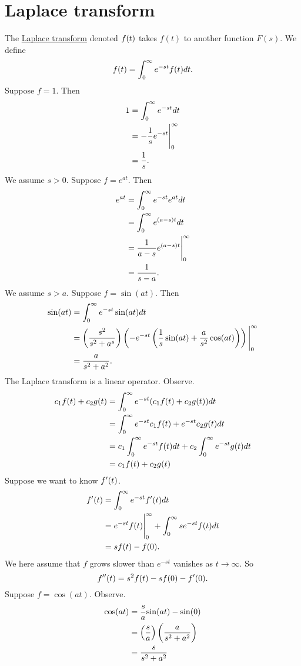 \documentclass[11pt, oneside]{article}   	%
\let\L\relax
\newcommand{\L}[1]{\mathcal{L}\left\{#1\right\}}
\begin{document}
\section{Laplace transform}
The \underline{Laplace transform} denoted $\L{f(t)}$ takes $f(t)$ to another function $F(s)$. We define
$$
\L{f(t)} = \int_0^\infty e^{-st}f(t) dt.
$$
Suppose $f=1$. Then 
\begin{align*}
\L{1} &= \int_0^\infty e^{-st}dt\\
	&= -\frac{1}{s}e^{-st} \Bigg|_0^\infty\\
	&= \frac{1}{s}.
\end{align*}
We assume $s>0$. Suppose $f = e^{at}$. Then
\begin{align*}
\L{e^{at}}	&= \int_0^\infty e^{-st}e^{at}dt\\
		&= \int_0^\infty e^{(a-s)t}dt\\
		&= \frac{1}{a-s}e^{(a-s)t} \Bigg|_0^\infty\\
		&= \frac{1}{s-a}.
\end{align*}
We assume $s>a$. Suppose $f = \sin({at})$. Then
\begin{align*}
\L{\sin(at)}	&= \int_0^\infty e^{-st}\sin(at)dt\\
		&= \left(\frac{s^2}{s^2+a^s}\right) \left(-e^{-st}\left( \frac{1}{s}\sin(at) + \frac{a}{s^2}\cos(at) \right)\right)\Bigg|_0^\infty\\
		&= \frac{a}{s^2+a^2} .
\end{align*}
The Laplace transform is a linear operator. Observe.
\begin{align*}
\L{c_1f(t) +c_2g(t)}	&= \int_0^\infty e^{-st}(c_1f(t) +c_2g(t))dt\\
				&= \int_0^\infty e^{-st}c_1f(t) + e^{-st}c_2g(t)dt\\
				&= c_1\int_0^\infty e^{-st}f(t)dt + c_2 \int_0^\infty e^{-st}g(t)dt\\
				&= c_1\L{f(t)} + c_2 \L{g(t)} 
\end{align*}
Suppose we want to know $\L{f'(t)}$.
\begin{align*}
\L{f'(t)}	&= \int_0^\infty e^{-st}f'(t)dt\\
		&= e^{-st}f(t)\Bigg|_0^\infty + \int_0^\infty se^{-st}f(t)dt\\
		&= s\L{f(t)} - f(0).
\end{align*}
We here assume that $f$ grows slower than $e^{-st}$ vanishes as $t\to \infty$. So
$$
\L{f''(t)} = s^2\L{f(t)} - sf(0) - f'(0).
$$
Suppose $f = \cos (at)$. Observe.
\begin{align*}
\L{\cos(at)}	&=  \frac{s}{a} \L{\sin(at)} - \sin(0)\\
			&= \left(\frac{s}{a}\right)\left( \frac{a}{s^2+a^2} \right) \\
			&= \frac{s}{s^2+a^2}
\end{align*}
\end{document}
